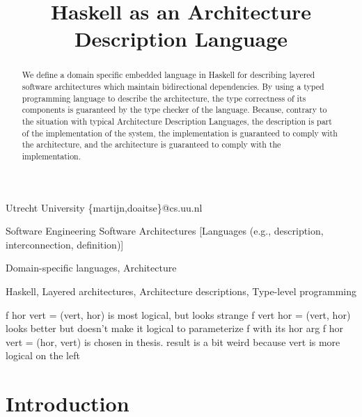 \documentclass[preprint,natbib]{sigplanconf}
\begin{document}
\copyrightdata{[to be supplied]} 

\preprintfooter{\version}   %

\title{Haskell as an Architecture Description Language}

           {Utrecht University}
           {\{martijn,doaitse\}@cs.uu.nl}

\maketitle

\begin{abstract}
We define a domain specific embedded language in Haskell for describing
layered software architectures which maintain bidirectional dependencies. By using a typed programming
language to describe the architecture, the type correctness of its components
is guaranteed by the type checker of the language. Because, contrary to the situation with typical Architecture Description Languages, the
description is part of the implementation of the
system, the implementation is guaranteed to comply with the architecture, and the architecture is guaranteed to comply with the implementation.
\end{abstract}

 {Software Engineering}
                  {Software Architectures}
                  [Languages (e.g., description, interconnection, definition)]

\terms
Domain-specific languages, Architecture

\keywords
Haskell, Layered architectures, Architecture descriptions, Type-level programming


\bc
f hor vert = (vert, hor) is most logical, but looks strange
f vert hor = (vert, hor) looks better but doesn't make it logical to parameterize f with its hor arg
f hor vert = (hor, vert) is chosen in thesis. result is a bit weird because vert is more logical on the left
\ec

\section{Introduction}\label{sect:introduction}
\end{document}
